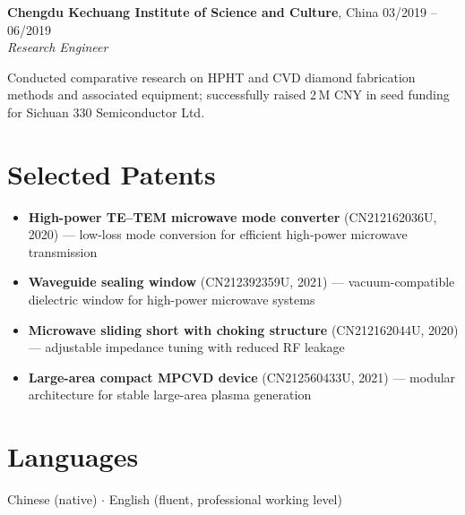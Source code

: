 \documentclass[a4paper,11pt]{article}
\begin{document}
\medskip
\noindent\textbf{Chengdu Kechuang Institute of Science and Culture}, China
\hfill 03/2019 -- 06/2019 \\
\textit{Research Engineer}

\noindent Conducted comparative research on HPHT and CVD diamond fabrication
methods and associated equipment; successfully raised 2\,M CNY in seed funding for
Sichuan 330 Semiconductor Ltd.

\section*{Selected Patents}

\begin{itemize}[noitemsep, topsep=2pt, leftmargin=*]
    \item \textbf{High-power TE--TEM microwave mode converter} (CN212162036U, 2020) ---
          low-loss mode conversion for efficient high-power microwave transmission
    \item \textbf{Waveguide sealing window} (CN212392359U, 2021) ---
          vacuum-compatible dielectric window for high-power microwave systems
    \item \textbf{Microwave sliding short with choking structure} (CN212162044U, 2020) ---
          adjustable impedance tuning with reduced RF leakage
    \item \textbf{Large-area compact MPCVD device} (CN212560433U, 2021) ---
          modular architecture for stable large-area plasma generation
\end{itemize}

\section*{Languages}

Chinese (native) \enspace $\cdot$ \enspace English (fluent, professional working level)
\end{document}

